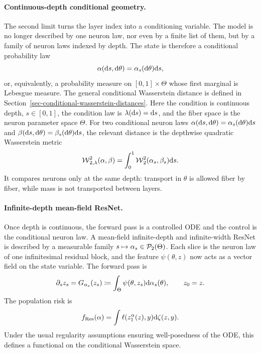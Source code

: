 \paragraph{Continuous-depth conditional geometry.}
The second limit turns the layer index into a conditioning variable. The model is no longer described by one neuron law, nor even by a finite list of them, but by a family of neuron laws indexed by depth. The state is therefore a conditional probability law
\[
	\alpha(\mathrm{d} s,\mathrm{d}\theta)=\alpha_s(\mathrm{d}\theta)\mathrm{d} s,
\]
or, equivalently, a probability measure on $[0,1]\times\Theta$ whose first marginal is Lebesgue measure. The general conditional Wasserstein distance is defined in Section~\ref{sec-conditional-wasserstein-distances}. Here the condition is continuous depth, $s\in[0,1]$, the condition law is $\lambda(\mathrm{d} s)=\mathrm{d} s$, and the fiber space is the neuron parameter space $\Theta$. For two conditional neuron laws $\alpha(\mathrm{d} s,\mathrm{d}\theta)=\alpha_s(\mathrm{d}\theta)\mathrm{d} s$ and $\beta(\mathrm{d} s,\mathrm{d}\theta)=\beta_s(\mathrm{d}\theta)\mathrm{d} s$, the relevant distance is the depthwise quadratic Wasserstein metric
\begin{equation}\label{eq-resnet-depth-wasserstein}
	\operatorname{\mathcal{W}}_{2,\lambda}^2(\alpha,\beta)
	=
	\int_0^1\operatorname{\mathcal{W}}_2^2(\alpha_s,\beta_s)\mathrm{d} s.
\end{equation}
It compares neurons only at the same depth: transport in $\theta$ is allowed fiber by fiber, while mass is not transported between layers.

\paragraph{Infinite-depth mean-field ResNet.}
Once depth is continuous, the forward pass is a controlled ODE and the control is the conditional neuron law. A mean-field infinite-depth and infinite-width ResNet is described by a measurable family $s\mapsto\alpha_s\in\mathcal{P}_2(\Theta)$. Each slice is the neuron law of one infinitesimal residual block, and the feature $\psi(\theta,z)$ now acts as a vector field on the state variable. The forward pass is
\begin{equation}\label{eq-mean-field-resnet-forward}
	\partial_s z_s
	=
	G_{\alpha_s}(z_s)
	\coloneqq
	\int_\Theta \psi(\theta,z_s)\mathrm{d}\alpha_s(\theta),
	\qquad z_0=z.
\end{equation}
The population risk is
\[
	f_{\mathrm{Res}}(\alpha)
	=
	\int \ell(z_1^\alpha(z),y)\mathrm{d}\zeta(z,y).
\]
Under the usual regularity assumptions ensuring well-posedness of the ODE, this defines a functional on the conditional Wasserstein space.

